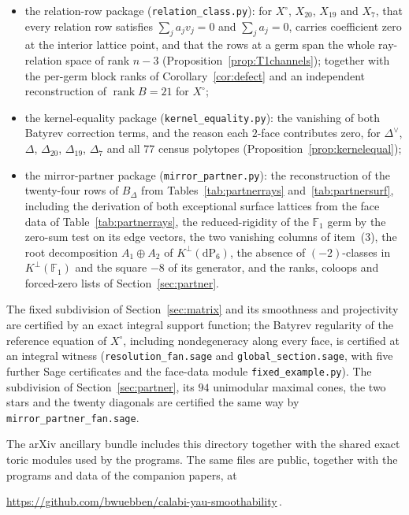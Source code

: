 \documentclass[11pt]{amsart}
\theoremstyle{definition}
\theoremstyle{remark}
\theoremstyle{plain}
\newcommand{\rk}{\operatorname{rank}}
\newcommand{\dP}{\mathrm{dP}}
\begin{document}
\begin{itemize}
\item the relation-row package (\texttt{relation\_class.py}): for
$X^{\circ}$, $X_{20}$, $X_{19}$ and $X_7$, that every relation row
satisfies $\sum_ja_jv_j=0$ and $\sum_ja_j=0$, carries coefficient zero
at the interior lattice point, and that the rows at a germ span the
whole ray-relation space of rank $n-3$
(Proposition~\ref{prop:T1channels}); together with the per-germ block
ranks of Corollary~\ref{cor:defect} and an independent reconstruction of
$\rk B=21$ for $X^{\circ}$;
\item the kernel-equality package (\texttt{kernel\_equality.py}): the
vanishing of both Batyrev correction terms, and the reason each $2$-face
contributes zero, for $\Delta^{\vee}$, $\Delta$, $\Delta_{20}$,
$\Delta_{19}$, $\Delta_7$ and all $77$ census polytopes
(Proposition~\ref{prop:kernelequal});
\item the mirror-partner package (\texttt{mirror\_partner.py}): the
reconstruction of the twenty-four rows of $B_{\Delta}$ from
Tables~\ref{tab:partnerrays} and~\ref{tab:partnersurf}, including the
derivation of both exceptional surface lattices from the face data of
Table~\ref{tab:partnerrays}, the reduced-rigidity of the
$\mathbb F_1$ germ by the zero-sum test on its edge vectors, the two
vanishing columns of item~(3), the root decomposition $A_1\oplus A_2$ of
$K^{\perp}(\dP_6)$, the absence of $(-2)$-classes in
$K^{\perp}(\mathbb F_1)$ and the square $-8$ of its generator, and the
ranks, coloops and forced-zero lists of Section~\ref{sec:partner}.
\end{itemize}
The fixed subdivision of Section~\ref{sec:matrix} and its
smoothness and projectivity are certified by an exact integral
support function; the Batyrev regularity of the reference equation
of $X^{\circ}$, including nondegeneracy along every face, is
certified at an integral witness (\texttt{resolution\_fan.sage} and
\texttt{global\_section.sage}, with five further Sage certificates
and the face-data module \texttt{fixed\_example.py}).  The
subdivision of Section~\ref{sec:partner}, its $94$ unimodular maximal
cones, the two stars and the twenty diagonals are certified the same
way by \texttt{mirror\_partner\_fan.sage}.

The arXiv ancillary bundle includes this directory together with the
shared exact toric modules used by the
programs.  The same files are public, together with the programs and
data of the companion papers, at
\begin{center}
\url{https://github.com/bwuebben/calabi-yau-smoothability}\,.
\end{center}
\end{document}
